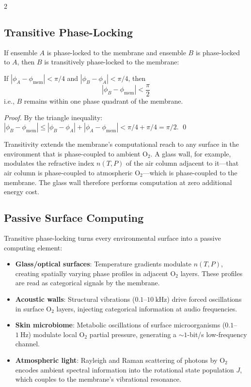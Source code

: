 \begin{multicols}{2}

\subsection{Transitive Phase-Locking}

If ensemble $A$ is phase-locked to the membrane and ensemble $B$ is phase-locked to $A$, then $B$ is transitively phase-locked to the membrane:

\begin{theorem}
\label{thm:transitive}
If $|\phi_A - \phi_{\mathrm{mem}}| < \pi/4$ and $|\phi_B - \phi_A| < \pi/4$, then
\begin{equation}
|\phi_B - \phi_{\mathrm{mem}}| < \frac{\pi}{2}
\label{eq:ch11_transitive}
\end{equation}
i.e., $B$ remains within one phase quadrant of the membrane.
\end{theorem}

\begin{proof}
By the triangle inequality: $|\phi_B - \phi_{\mathrm{mem}}| \leq |\phi_B - \phi_A| + |\phi_A - \phi_{\mathrm{mem}}| < \pi/4 + \pi/4 = \pi/2$. \qed
\end{proof}

Transitivity extends the membrane's computational reach to any surface in the environment that is phase-coupled to ambient O$_2$. A glass wall, for example, modulates the refractive index $n(T, P)$ of the air column adjacent to it---that air column is phase-coupled to atmospheric O$_2$---which is phase-coupled to the membrane. The glass wall therefore performs computation at zero additional energy cost.

\subsection{Passive Surface Computing}

Transitive phase-locking turns every environmental surface into a passive computing element:

\begin{itemize}
\item \textbf{Glass/optical surfaces}: Temperature gradients modulate $n(T, P)$, creating spatially varying phase profiles in adjacent O$_2$ layers. These profiles are read as categorical signals by the membrane.
\item \textbf{Acoustic walls}: Structural vibrations ($0.1$--$10\ \mathrm{kHz}$) drive forced oscillations in surface O$_2$ layers, injecting categorical information at audio frequencies.
\item \textbf{Skin microbiome}: Metabolic oscillations of surface microorganisms ($0.1$--$1\ \mathrm{Hz}$) modulate local O$_2$ partial pressure, generating a $\sim 1$-bit/s low-frequency channel.
\item \textbf{Atmospheric light}: Rayleigh and Raman scattering of photons by O$_2$ encodes ambient spectral information into the rotational state population $J$, which couples to the membrane's vibrational resonance.
\end{itemize}


\end{multicols}

